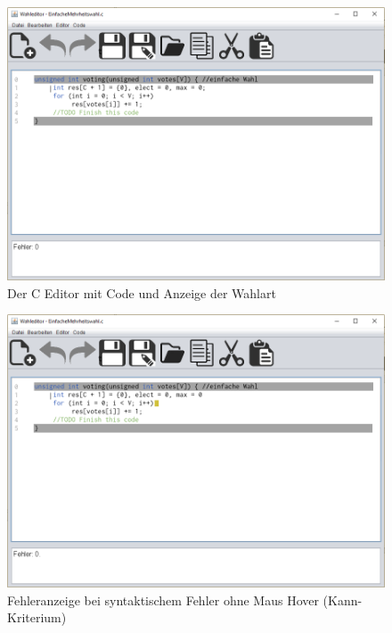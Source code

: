 \documentclass[a4paper]{scrreprt}
\begin{document}
\begin{figure}[H]
\includegraphics[scale=0.5]{Editor-mit-text.png}
\caption{Der C Editor mit Code und Anzeige der Wahlart}
\label{Editor-mit-text}
\end{figure}

\begin{figure}[H]
\includegraphics[scale=0.5]{Editor-mit-Fehler-ohne-hover.png}
\caption{Fehleranzeige bei syntaktischem Fehler ohne Maus Hover (Kann-Kriterium)}
\label{Editor-mit-Fehler-ohne-hover}
\end{figure}
\end{document}
